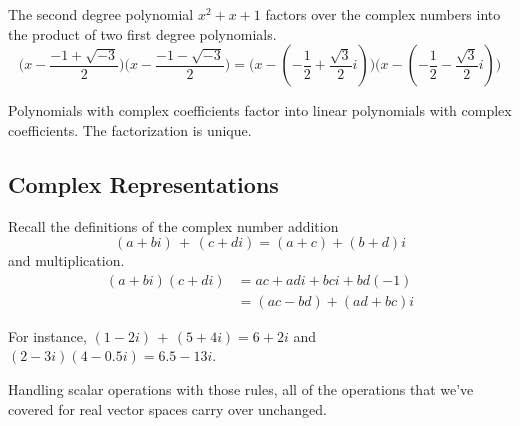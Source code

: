 \begin{example}
The second degree polynomial \( x^2+x+1 \) factors over the complex numbers 
into the product of two first degree polynomials.
\begin{equation*}
   \big(x-\frac{-1+\sqrt{-3}}{2}\big)
   \big(x-\frac{-1-\sqrt{-3}}{2}\big)
   =
   \big(x-(-\frac{1}{2}+\frac{\sqrt{3}}{2}i)\big)
   \big(x-(-\frac{1}{2}-\frac{\sqrt{3}}{2}i)\big)
\end{equation*}
\end{example}

\begin{theorem} \label{th:FundThmAlg}
\hspace*{0em plus2em}
Polynomials with complex coefficients factor into linear
polynomials with complex coefficients.
The factorization is unique.
\end{theorem}











\subsection{Complex Representations}
Recall the definitions of the complex number addition
\begin{equation*}
   (a+bi)\,+\,(c+di)=(a+c)+(b+d)i                  
\end{equation*}
and multiplication.
\begin{align*}
     (a+bi)(c+di) &=ac+adi+bci+bd(-1)  \\
                  &=(ac-bd)+(ad+bc)i
\end{align*}

\begin{example}
For instance,
\( (1-2i)\,+\,(5+4i)=6+2i \) and
\( (2-3i)(4-0.5i)=6.5-13i \).
\end{example}

Handling scalar operations with those rules, all of
the operations that we've covered
for real vector spaces carry over unchanged.


